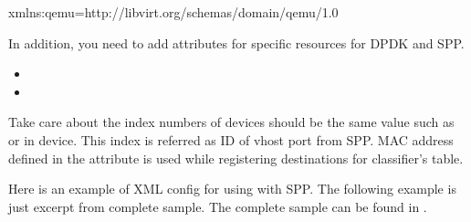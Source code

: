 \documentclass[a4paper,11pt,openany,oneside,english]{sphinxmanual}
\begin{document}
\begin{sphinxVerbatim}[commandchars=\\\{\},formatcom=\footnotesize]
xmlns:qemu=\PYGZsq{}http://libvirt.org/schemas/domain/qemu/1.0\PYGZsq{}
\end{sphinxVerbatim}

In addition, you need to add attributes for specific resources for DPDK and SPP.
\begin{itemize}
\item {} 

\item {} 

\end{itemize}

Take care about the index numbers of devices should be the same value such as
 or  in  device. This index is referred as
ID of vhost port from SPP. MAC address defined in the attribute is used while
registering destinations for classifier’s table.

\begin{sphinxVerbatim}[commandchars=\\\{\},formatcom=\footnotesize]
 
\end{sphinxVerbatim}

Here is an example of XML config for using with SPP.
The following example is just excerpt from complete
sample.
The complete sample can be found in
.
\end{document}
